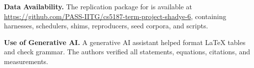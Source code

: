 \noindent\textbf{Data Availability.}
\label{sec:data}
The replication package for \tool is available at \url{https://github.com/PASS-IITG/cs5187-term-project-shadye-6}, containing harnesses, schedulers, shims, reproducers, seed corpora, and scripts.

\noindent\textbf{Use of Generative AI.}
A generative AI assistant helped format LaTeX tables and check grammar.
The authors verified all statements, equations, citations, and measurements.
